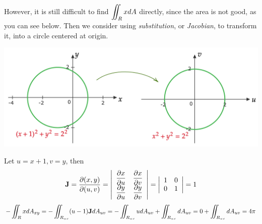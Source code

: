 \begin{spacing}{1.3}
    However, it is still difficult to find $\displaystyle \iint_R x dA$ directly, since the 
    area is not good, as you can see below. Then we consider using {\it substitution},
    or {\it Jacobian}, to transform it, into a circle centered at origin.
    \begin{center}
        \includegraphics[scale=0.4]{images/Ch15-ex6.2.png}
    \end{center}
    Let $u=x+1, v=y$, then
    $${\bf J}=\frac{\partial (x,y)}{\partial (u,v)}=
    \left|\begin{array}{cc}
        \dfrac{\partial x}{\partial u} & \dfrac{\partial x}{\partial v}\\
        \dfrac{\partial y}{\partial u} & \dfrac{\partial y}{\partial v}
    \end{array} \right|=\left|\begin{array}{cc}
        1 & 0 \\ 0 & 1
    \end{array} \right| = 1$$
    $$-\iint_R x dA_{xy}=-\iint_{R_{uv}} (u-1) {\bf J} dA_{uv}=
    -\iint_{R_{uv}}u dA_{uv} + \iint_{R_{uv}}dA_{uv}= 0+
    \iint_{R_{uv}}dA_{uv}=4\pi$$
\end{spacing}
